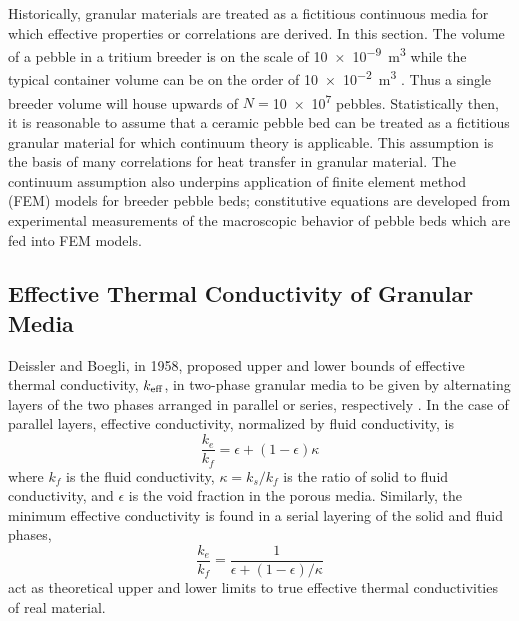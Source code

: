 Historically, granular materials are treated as a fictitious continuous media for which effective properties or correlations are derived. In this section. The volume of a pebble in a tritium breeder is on the scale of \SI{10e-9}{\cubic\meter} while the typical container volume can be on the order of \SI{10e-2}{\cubic\meter} \cite{Cho2008}.  Thus a single breeder volume will house upwards of $N =$\num{10e7} pebbles. Statistically then, it is reasonable to assume that a ceramic pebble bed can be treated as a fictitious granular material for which continuum theory is applicable. This assumption is the basis of many correlations for heat transfer in granular material. The continuum assumption also underpins application of finite element method (FEM) models for breeder pebble beds; constitutive equations are developed from experimental measurements of the macroscopic behavior of pebble beds which are fed into FEM models.




\subsection{Effective Thermal Conductivity of Granular Media}


Deissler and Boegli, in 1958, proposed upper and lower bounds of effective thermal conductivity, $k_\text{eff}$, in two-phase granular media to be given by alternating layers of the two phases arranged in parallel or series, respectively \cite{Deissler1958}. In the case of parallel layers, effective conductivity, normalized by fluid conductivity, is
\begin{equation}\label{eq:keff-parallel}
	\frac{k_e}{k_f} = \epsilon + (1-\epsilon)\kappa
\end{equation}
where $k_f$ is the fluid conductivity, $\kappa = k_s/k_f$ is the ratio of solid to fluid conductivity, and $\epsilon$ is the void fraction in the porous media. Similarly, the minimum effective conductivity is found in a serial layering of the solid and fluid phases,
\begin{equation}\label{eq:keff-series}
	\frac{k_e}{k_f} = \frac{1}{\epsilon + (1-\epsilon)/\kappa}
\end{equation}
 act as theoretical upper and lower limits to true effective thermal conductivities of real material. %

